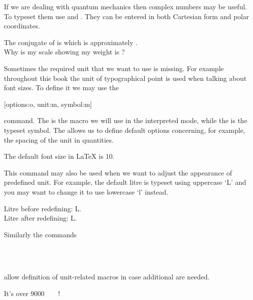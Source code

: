 If we are dealing with quantum mechanics then complex numbers may be useful.
To typeset them use  and . They can be entered in
both Cartesian form and polar coordinates.

\begin{example}[examplewidth=0.5\linewidth]
The conjugate of
 is
which is approximately
. \\
Why is my scale showing my
weight is
?
\end{example}

Sometimes the required unit that we want to use is missing. For example
throughout this book the unit of typographical point is used when talking about
font sizes. To define it we may use the
\begin{lscommand}
  [options:o, unit:m, symbol:m]
\end{lscommand}
command. The  is the macro we will use in the interpreted mode,
while the  is the typeset symbol. The  allows us to
define default options concerning, for example, the spacing of the unit in
quantities.
\begin{example}
The default font size
in \LaTeX{} is \qty{10}{\pt}.
\end{example}

This command may also be used when we want to adjust the appearance of
predefined unit. For example, the default litre is typeset using uppercase
\enquote*{L} and you may want to change it to use lowercase \enquote*{l}
instead.
\begin{example}
Litre before redefining:
\unit{\L}. \\
Litre after redefining:
\unit{\L}.
\end{example}

Similarly the commands
\begin{lscommand}
      \\
       \\
\end{lscommand}
allow definition of unit-related macros in case additional are needed.
\begin{example}[examplewidth=0.8\linewidth, vertical_mode]
\DeclareSIPower\quartic{}
\DeclareSIPrefix{}
\DeclareSIQualifier{}

It's over \qty{9000}{\quartic\decakilo\pt\polymer}!
\end{example}

